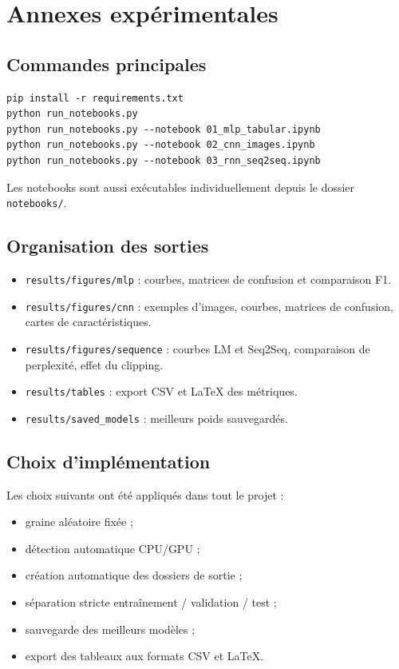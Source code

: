 \chapter{Annexes expérimentales}

\section{Commandes principales}
\begin{verbatim}
pip install -r requirements.txt
python run_notebooks.py
python run_notebooks.py --notebook 01_mlp_tabular.ipynb
python run_notebooks.py --notebook 02_cnn_images.ipynb
python run_notebooks.py --notebook 03_rnn_seq2seq.ipynb
\end{verbatim}
Les notebooks sont aussi exécutables individuellement depuis le dossier \texttt{notebooks/}.

\section{Organisation des sorties}
\begin{itemize}[leftmargin=1.2cm]
    \item \texttt{results/figures/mlp} : courbes, matrices de confusion et comparaison F1.
    \item \texttt{results/figures/cnn} : exemples d’images, courbes, matrices de confusion, cartes de caractéristiques.
    \item \texttt{results/figures/sequence} : courbes LM et Seq2Seq, comparaison de perplexité, effet du clipping.
    \item \texttt{results/tables} : export CSV et LaTeX des métriques.
    \item \texttt{results/saved\_models} : meilleurs poids sauvegardés.
\end{itemize}

\section{Choix d’implémentation}
Les choix suivants ont été appliqués dans tout le projet :
\begin{itemize}[leftmargin=1.2cm]
    \item graine aléatoire fixée ;
    \item détection automatique CPU/GPU ;
    \item création automatique des dossiers de sortie ;
    \item séparation stricte entraînement / validation / test ;
    \item sauvegarde des meilleurs modèles ;
    \item export des tableaux aux formats CSV et LaTeX.
\end{itemize}

